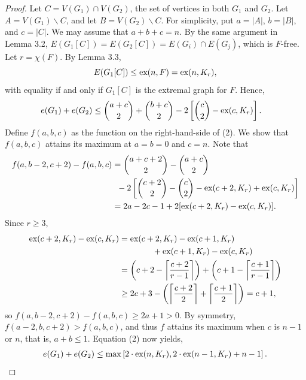 \documentclass[a4paper]{article}
\begin{document}
\begin{proof}
  Let $C = V(G_1) \cap V(G_2)$, the set of vertices in both $G_1$ and $G_2$. Let $A = V(G_1)
  \backslash C$, and let $B = V(G_2) \backslash C$. For simplicity, put $a = |A|$, $b = |B|$, and $c
  = |C|$. We may assume that $a + b + c = n$. By the same argument in Lemma 3.2, $E(G_1[C]) =
  E(G_2[C]) = E(G_i) \cap E(G_j)$, which is $F$-free. Let $r = \chi(F)$. By Lemma 3.3, 
  \[
    E(G_1[C]) \leq \textnormal{ex}(n, F) = \textnormal{ex}(n, K_r),
  \]
  with equality if and only if $G_1[C]$ is the extremal graph for $F$. Hence, 
  \begin{align}
    e(G_1) + e(G_2) 
    &\leq \binom{a + c}{2} + \binom{b + c}{2} - 2\left[\binom{c}{2} - \textnormal{ex}(c, K_r)\right].
  \end{align}
  Define $f(a, b, c)$ as the function on the right-hand-side of (2). We show that $f(a, b, c)$
  attains its maximum at $a = b = 0$ and $c = n$. Note that
  \begin{align*}
    f(a, b - 2, c + 2) - f(a, b, c)
    &= \binom{a + c + 2}{2} - \binom{a + c}{2} \\
    &\;\; - 2\left[\binom{c + 2}{2} - \binom{c}{2} - \textnormal{ex}(c + 2, K_r) + \textnormal{ex}(c, K_r)\right] \\
    &= 2a - 2c - 1 + 2[\textnormal{ex}(c + 2, K_r) - \textnormal{ex}(c, K_r)].
  \end{align*}
  Since $r \geq 3$,
  \begin{align*}
    \textnormal{ex}(c + 2, K_r) - \textnormal{ex}(c, K_r) &= \textnormal{ex}(c + 2, K_r) - \textnormal{ex}(c + 1, K_r) \\
    &\qquad\qquad + \textnormal{ex}(c + 1, K_r) - \textnormal{ex}(c, K_r) \\
    &= \left(c + 2 - \left\lceil \frac{c + 2}{r - 1} \right\rceil\right) + \left(c + 1 - \left\lceil \frac{c + 1}{r - 1} \right\rceil\right) \\
    &\geq 2c + 3 - \left(\left\lceil \frac{c + 2}{2} \right\rceil + \left\lceil \frac{c + 1}{2} \right\rceil\right) = c + 1,
  \end{align*}
  so $f(a, b - 2, c + 2) - f(a, b, c) \geq 2a + 1 > 0$. By symmetry, $f(a - 2, b, c + 2) > f(a, b,
  c)$, and thus $f$ attains its maximum when $c$ is $n - 1$ or $n$, that is, $a + b \leq 1$.
  Equation (2) now yields, 
  \begin{align*}
    e(G_1) + e(G_2) \leq \max\left[2 \cdot \textnormal{ex}(n, K_r), 2 \cdot \textnormal{ex}(n - 1, K_r) + n - 1\right].
  \end{align*}

\end{proof}
\end{document}
